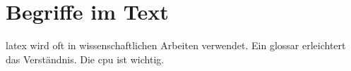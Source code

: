 \documentclass{article}
\begin{document}
\section*{Begriffe im Text}

\gls{latex} wird oft in wissenschaftlichen Arbeiten verwendet.  
Ein \gls{glossar} erleichtert das Verständnis.  
Die \gls{cpu} ist wichtig.

\printglossaries
\end{document}
